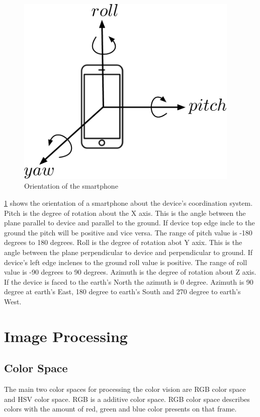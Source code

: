 \begin{figure}
\centering
\includegraphics[width=4.2in]{figures/roll_pitch_yaw.pdf}
\caption{Orientation of the smartphone}
\label{f:rpy_dia}
\end{figure}

\ref{f:rpy_dia} shows the orientation of a smartphone about the device's coordination system.
Pitch is the degree of rotation about the X axis.
This is the angle between the plane parallel to device and parallel to the ground.
If device top edge incle to the ground the pitch will be positive and vice versa.
The range of pitch value is -180 degrees to 180 degrees.
Roll is the degree of rotation abot Y axix.
This is the angle between the plane perpendicular to device and perpendicular to ground.
If device's left edge inclenes to the ground roll value is positive.
The range of roll value is -90 degrees to 90 degrees.
Azimuth is the degree of rotation about Z axis.
If the device is faced to the earth's North the azimuth is 0 degree.
Azimuth is 90 degree at earth's East, 180 degree to earth's South and 270 degree to earth's West.

\section {Image Processing}

\subsection{Color Space}
The main two color spaces for processing the color vision are RGB color space and HSV color space.
RGB is a additive color space.
RGB color space describes colors with the amount of red, green and blue color presents on that frame.


